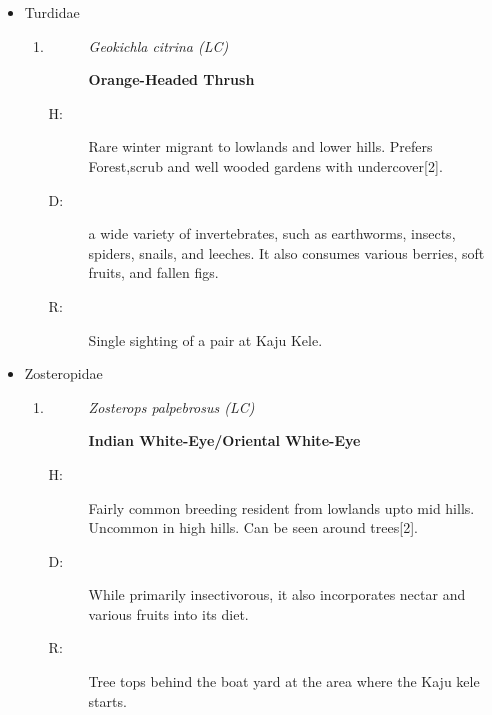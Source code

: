 \begin{itemize}
\begin{enumerate}
\begin{description}
\item[]%
\textbf{Dark{-}Fronted Babbler}%
\end{description}%
\begin{description}%
\item[H: ]%
Uncommon breeding resident throughout Sri Lanka. Prefers dense undergrowth in forests{[}2{]}.%
\item[D: ]%
Primarily insectivorous.%
\item[R: ]%
Only a single individual. Several observations at the marshes near hotspot 2. Displayed pseudo nesting behaviour. Nest got destroyed by the fire set on garbage.%
\end{description}%
\end{enumerate}%
\item%
Turdidae%
\begin{enumerate}%
\item%
\begin{description}%
\item[]%
\textit{Geokichla citrina (LC)}%
\item[]%
\textbf{Orange{-}Headed Thrush}%
\end{description}%
\begin{description}%
\item[H: ]%
Rare winter migrant to lowlands and lower hills. Prefers Forest,scrub and well wooded gardens with undercover{[}2{]}.%
\item[D: ]%
a wide variety of invertebrates, such as earthworms, insects, spiders, snails, and leeches. It also consumes various berries, soft fruits, and fallen figs.%
\item[R: ]%
Single sighting of a pair at Kaju Kele.%
\end{description}%
\end{enumerate}%
\item%
Zosteropidae%
\begin{enumerate}%
\item%
\begin{description}%
\item[]%
\textit{Zosterops palpebrosus (LC)}%
\item[]%
\textbf{Indian White{-}Eye/Oriental White{-}Eye}%
\end{description}%
\begin{description}%
\item[H: ]%
Fairly common breeding resident from lowlands upto mid hills. Uncommon in high hills. Can be seen around trees{[}2{]}.%
\item[D: ]%
While primarily insectivorous, it also incorporates nectar and various fruits into its diet.%
\item[R: ]%
Tree tops behind the boat yard at the area where the Kaju kele starts.%
\end{description}%
\end{enumerate}%
\end{itemize}